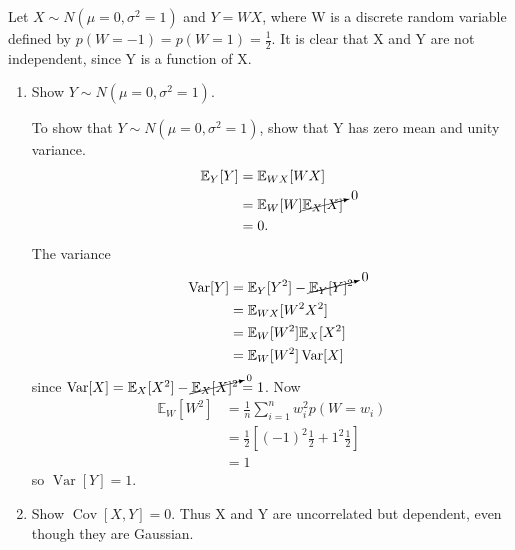 \begin{example}
	Let $X\sim N(\mu =0, \sigma^2 = 1)$ and $Y = WX$, where W is a discrete random variable defined by $p(W=-1)=p(W=1)=\frac{1}{2}$. It is clear that X and Y are not independent, since Y is a function of X.
	\begin{enumerate}
		\item Show $Y\sim N(\mu =0, \sigma^2 = 1)$.\newline
		
		To show that $Y\sim N(\mu =0, \sigma^2 = 1)$, show that Y has zero mean and unity variance.
		\begin{equation}
			\begin{split}
				\mathbb{E}_Y[Y] &= \mathbb{E}_{WX}[WX]\\
				&=\mathbb{E}_W[W]\cancelto{0}{\mathbb{E}_X[X]}\\
				&=0.
			\end{split}
		\end{equation}
		The variance
		\begin{equation}
			\begin{split}
				\operatorname{Var}[Y] &= \mathbb{E}_Y[Y^2]-\cancelto{0}{\mathbb{E}_Y[Y]^2}\\
				& = \mathbb{E}_{WX}[W^2X^2]\\
				&= \mathbb{E}_W[W^2]\mathbb{E}_X[X^2]\\
				& = \mathbb{E}_W[W^2]\operatorname{Var}[X]
			\end{split}
		\end{equation}
		since $\operatorname{Var}[X]=\mathbb{E}_X[X^2]-\cancelto{0}{\mathbb{E}_X[X]^2}=1$. Now
		\begin{equation}
			\begin{split}
				\mathbb{E}_W[W^2]&= \frac{1}{n}\sum_{i=1}^nw_i^2p(W = w_i)\\
				&= \frac{1}{2}[(-1)^2\frac{1}{2}+1^2\frac{1}{2}]\\
				&= 1
			\end{split}
		\end{equation}
		so $\operatorname{Var}[Y] =1$.
		\item Show $\operatorname{Cov}[X,Y]=0$. Thus X and Y are uncorrelated but dependent, even though they are Gaussian.
		

\end{enumerate}
\end{example}
